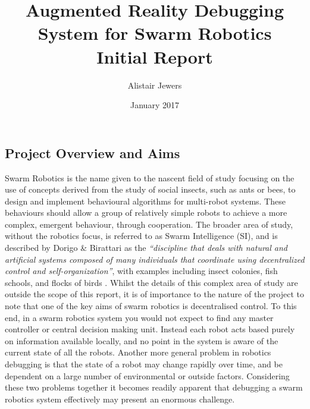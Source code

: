 \documentclass[titlepage,hidelinks,10pt]{article}
\date{January 2017}
\title{Augmented Reality Debugging System for Swarm Robotics \vspace{1cm}\\\Large{Initial Report}}
\author{Alistair Jewers}
\begin{document}
\maketitle

\tableofcontents
\newpage

\begin{multicols}{2}


\section{Project Overview and Aims}
Swarm Robotics is the name given to the nascent field of study focusing on the use of concepts derived from the study of social insects, such as ants or bees, to design and implement behavioural algorithms for multi-robot systems. These behaviours should allow a group of relatively simple robots to achieve a more complex, emergent behaviour, through cooperation\cite{SwarmRoboticsDefinition}. The broader area of study, without the robotics focus, is referred to as Swarm Intelligence (SI), and is described by Dorigo \& Birattari as the \textit{``discipline that deals with natural and artificial systems composed of many individuals that coordinate using decentralized control and self-organization''}, with examples including insect colonies, fish schools, and flocks of birds \cite{SwarmIntelligence}. Whilst the details of this complex area of study are outside the scope of this report, it is of importance to the nature of the project to note that one of the key aims of swarm robotics is decentralised control. To this end, in a swarm robotics system you would not expect to find any master controller or central decision making unit. Instead each robot acts based purely on information available locally, and no point in the system is aware of the current state of all the robots. Another more general problem in robotics debugging is that the state of a robot may change rapidly over time, and be dependent on a large number of environmental or outside factors. Considering these two problems together it becomes readily apparent that debugging a swarm robotics system effectively may present an enormous challenge. 


\end{multicols}
\end{document}
